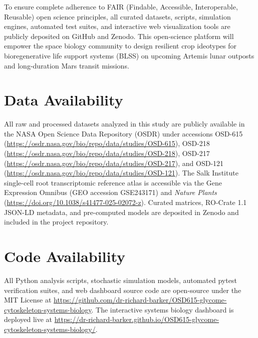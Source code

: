 To ensure complete adherence to FAIR (Findable, Accessible, Interoperable, Reusable) open science principles, all curated datasets, scripts, simulation engines, automated test suites, and interactive web visualization tools are publicly deposited on GitHub and Zenodo. This open-science platform will empower the space biology community to design resilient crop ideotypes for bioregenerative life support systems (BLSS) on upcoming Artemis lunar outposts and long-duration Mars transit missions.

\section*{Data Availability}
All raw and processed datasets analyzed in this study are publicly available in the NASA Open Science Data Repository (OSDR) under accessions OSD-615 (\url{https://osdr.nasa.gov/bio/repo/data/studies/OSD-615}), OSD-218 (\url{https://osdr.nasa.gov/bio/repo/data/studies/OSD-218}), OSD-217 (\url{https://osdr.nasa.gov/bio/repo/data/studies/OSD-217}), and OSD-121 (\url{https://osdr.nasa.gov/bio/repo/data/studies/OSD-121}). The Salk Institute single-cell root transcriptomic reference atlas is accessible via the Gene Expression Omnibus (GEO accession GSE243171) and \textit{Nature Plants} (\url{https://doi.org/10.1038/s41477-025-02072-z}). Curated matrices, RO-Crate 1.1 JSON-LD metadata, and pre-computed models are deposited in Zenodo and included in the project repository.

\section*{Code Availability}
All Python analysis scripts, stochastic simulation models, automated pytest verification suites, and web dashboard source code are open-source under the MIT License at \url{https://github.com/dr-richard-barker/OSD615-glycome-cytoskeleton-systems-biology}. The interactive systems biology dashboard is deployed live at \url{https://dr-richard-barker.github.io/OSD615-glycome-cytoskeleton-systems-biology/}.
